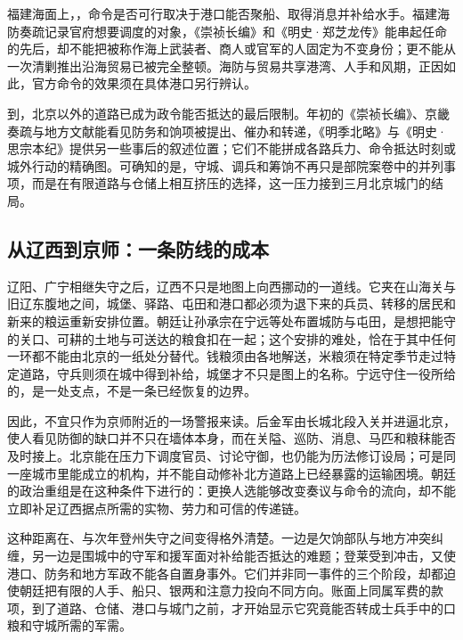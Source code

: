 福建海面上，，命令是否可行取决于港口能否聚船、取得消息并补给水手。福建海防奏疏记录官府想要调度的对象，《崇祯长编》和《明史·郑芝龙传》能串起任命的先后，却不能把被称作海上武装者、商人或官军的人固定为不变身份；更不能从一次清剿推出沿海贸易已被完全整顿。海防与贸易共享港湾、人手和风期，正因如此，官方命令的效果须在具体港口另行辨认。

到，北京以外的道路已成为政令能否抵达的最后限制。年初的《崇祯长编》、京畿奏疏与地方文献能看见防务和饷项被提出、催办和转递，《明季北略》与《明史·思宗本纪》提供另一些事后的叙述位置；它们不能拼成各路兵力、命令抵达时刻或城外行动的精确图。可确知的是，守城、调兵和筹饷不再只是部院案卷中的并列事项，而是在有限道路与仓储上相互挤压的选择，这一压力接到三月北京城门的结局。
\subsection{从辽西到京师：一条防线的成本}

辽阳、广宁相继失守之后，辽西不只是地图上向西挪动的一道线。它夹在山海关与旧辽东腹地之间，城堡、驿路、屯田和港口都必须为退下来的兵员、转移的居民和新来的粮运重新安排位置。朝廷让孙承宗在宁远等处布置城防与屯田，是想把能守的关口、可耕的土地与可送达的粮食扣在一起；这个安排的难处，恰在于其中任何一环都不能由北京的一纸处分替代。钱粮须由各地解送，米粮须在特定季节走过特定道路，守兵则须在城中得到补给，城堡才不只是图上的名称。宁远守住一役所给的，是一处支点，不是一条已经恢复的边界。

因此，不宜只作为京师附近的一场警报来读。后金军由长城北段入关并进逼北京，使人看见防御的缺口并不只在墙体本身，而在关隘、巡防、消息、马匹和粮秣能否及时接上。北京能在压力下调度官员、讨论守御，也仍能为历法修订设局；可是同一座城市里能成立的机构，并不能自动修补北方道路上已经暴露的运输困境。朝廷的政治重组是在这种条件下进行的：更换人选能够改变奏议与命令的流向，却不能立即补足辽西据点所需的实物、劳力和可信的传递链。

这种距离在、与次年登州失守之间变得格外清楚。一边是欠饷部队与地方冲突纠缠，另一边是围城中的守军和援军面对补给能否抵达的难题；登莱受到冲击，又使港口、防务和地方军政不能各自置身事外。它们并非同一事件的三个阶段，却都迫使朝廷把有限的人手、船只、银两和注意力投向不同方向。账面上同属军费的款项，到了道路、仓储、港口与城门之前，才开始显示它究竟能否转成士兵手中的口粮和守城所需的军需。

